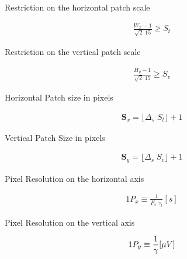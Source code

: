 \begin{subappendices}
Restriction on the horizontal patch scale

\begin{align*}
\frac{W_x-1}{\sqrt{2} \; 15}  \geq S_t 
\end{align*}

Restriction on the vertical patch scale

\begin{align*}
\frac{H_y-1}{\sqrt{2} \; 15}  \geq S_v 
\end{align*}

Horizontal Patch size in pixels

\begin{align*}
\mathbf{S}_x = \lfloor \Delta_s \; S_t \rfloor + 1
\end{align*}

Vertical Patch Size in pixels

\begin{align*}
\mathbf{S}_y = \lfloor \Delta_s \; S_v \rfloor + 1
\end{align*}

Pixel Resolution on the horizontal axis

\begin{align*}
1 P_x \equiv \frac{1}{F_s  \; \gamma_t}  [\si{s}]
\end{align*}

Pixel Resolution on the vertical axis

\begin{align*}
1 P_y \equiv \frac{1}{\gamma}  [\si\mu{V}]
\end{align*}

\end{subappendices}